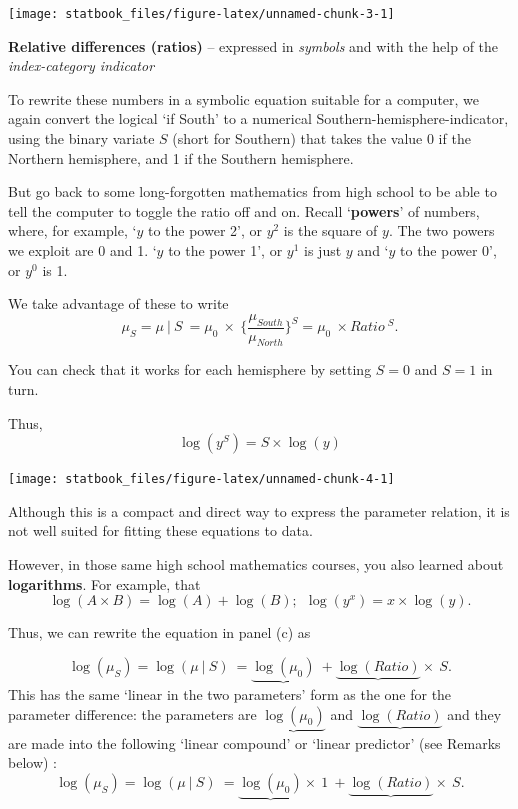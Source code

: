 \documentclass[]{book}
\begin{document}
\begin{center}\texttt{[image: statbook\_files/figure-latex/unnamed-chunk-3-1]} \end{center}

\textbf{Relative differences (ratios)} -- expressed in \emph{symbols} and with the help of the \emph{index-category indicator}

To rewrite these numbers in a symbolic equation suitable for a computer, we again convert the logical `if South' to a numerical Southern-hemisphere-indicator, using the binary variate \(S\) (short for Southern) that takes the value 0 if the Northern hemisphere, and 1 if the Southern hemisphere.

But go back to some long-forgotten mathematics from high school to be able to tell the computer to toggle the ratio off and on. Recall `\textbf{powers}' of numbers, where, for example,
`\(y\) to the power 2', or \(y^2\) is the square of \(y\). The two powers we exploit are 0 and 1.
`\(y\) to the power 1', or \(y^1\) is just \(y\) and `\(y\) to the power 0', or \(y^0\) is 1.

We take advantage of these to write
\[\mu_S = \mu \ | \ S  \ = \mu_0 \ \times \  \Big\{ \frac{\mu_{South}}{\mu_{North}}\Big\}^S = \mu_0 \ \times Ratio \ ^ S.\]

You can check that it works for each hemisphere by setting \(S=0\) and \(S=1\) in turn.

Thus, \[\log(y^S) = S \times \log(y)\]

\begin{center}\texttt{[image: statbook\_files/figure-latex/unnamed-chunk-4-1]} \end{center}

Although this is a compact and direct way to express the
parameter relation, it is not well suited for fitting these equations to data.

However, in those same high school mathematics courses, you also learned about \textbf{logarithms}. For example, that
\[\log(A \times B) = \log(A) + \log(B); \ \  \log(y^x) = x \times \log(y).\]

Thus, we can rewrite the equation in panel (c) as

\[\log(\mu_S) = \log(\mu \ | \ S)  \ = \underbrace{\log(\mu_0)} \ +  \underbrace{\log(Ratio)} \times \ S.\]
This has the same `linear in the two parameters' form as the one for the parameter difference: the parameters are
\(\underbrace{\log(\mu_0)}\) and \(\underbrace{\log(Ratio)}\) and they are made into the following `linear compound' or `linear predictor' (see Remarks below) :
\[\log(\mu_S) = \log(\mu \ | \ S)  \ = \underbrace{\log(\mu_0)} \times \ 1 \ + \underbrace{\log(Ratio)} \times \ S.\]
\end{document}
